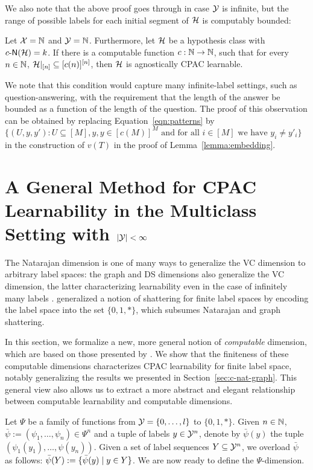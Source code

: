 \documentclass[11pt]{article}
\begin{document}
We also note that the above proof goes through in case $\mathcal{Y}$ is infinite, but the range of possible labels for each initial segment of $\mathcal{H}$ is computably bounded:
\begin{observation}
    Let $\mathcal{X}= \mathbb{N}$ and $\mathcal{Y}= \mathbb{N} $. Furthermore, let $\mathcal{H}$ be a hypothesis class with $c\text{-}\mathsf{N}(\mathcal{H})=k$.  If there is a computable function $c: \mathbb{N} \to \mathbb{N} $, such that for every $n\in \mathbb{N}$, $\mathcal{H}|_{[n]} \subseteq [c(n)]^{[n]}$, then $\mathcal{H}$ is agnostically CPAC learnable.
\end{observation}
We note that this condition would capture many infinite-label settings, such as question-answering, with the requirement that the length of the answer be bounded as a function of the length of the question. 
The proof of this observation can be obtained by replacing Equation~\ref{eqn:patterns} by  $\{(U,y,y'): U\subseteq [M], y,y\in [c(M)]^M \text{ and for all } i \in [M] \text{ we have } y_i \neq y'_i \}$ in the construction of $v(T)$ in the proof of Lemma~\ref{lemma:embedding}. 

\section{A General Method for CPAC Learnability in the Multiclass Setting with $|\mathcal{Y}|<\infty$}
\label{sec:gen-method}

The Natarajan dimension is one of many ways to generalize the VC dimension to arbitrary label spaces: the graph and DS dimensions also generalize the VC dimension, the latter characterizing learnability even in the case of infinitely many labels \citep{daniely2014optimal,brukhim2022characterization}.
\cite{ben1992characterizations} generalized a notion of shattering for finite label spaces by encoding the label space into the set $\{0,1,*\}$, which subsumes Natarajan and graph shattering.

In this section, we formalize a new, more general notion of \emph{computable} dimension, which are based on those presented by \cite{ben1992characterizations}.
We show that the finiteness of these computable dimensions characterizes CPAC learnability for finite label space, notably generalizing the results we presented in Section~\ref{sec:c-nat-graph}.
This general view also allows us to extract a more abstract and elegant relationship between computable learnability and computable dimensions.

Let $\Psi$ be a family of functions from $\mathcal{Y}=\{0,\dots,l\}$ to $\{0,1,*\}$.
Given $n\in \mathbb{N}$, $\bar{\psi}:=(\psi_1,\dots,\psi_n)\in\Psi^n$ and a tuple of labels $y\in\mathcal{Y}^n$, denote by $\bar{\psi}(y)$ the tuple $(\psi_1(y_1),\dots,\psi(y_n))$.
Given a set of label sequences $Y\subseteq\mathcal{Y}^n$, we overload $\bar{\psi}$ as follows: $\bar{\psi}(Y):=\{\bar{\psi}(y)\;|\; y \in Y\}$.
We are now ready to define the $\Psi$-dimension.
\end{document}
